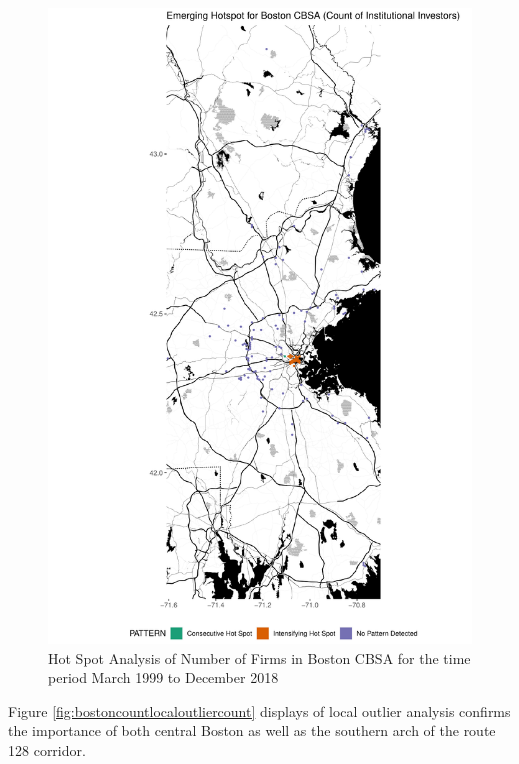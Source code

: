 \begin{figure}
	\centering
	\includegraphics[width=1\linewidth]{Figures/ChapterIV/Bos_Count_EH}
	\caption[Hot Spot Analysis of Number of Firms in Boston CBSA 1999-2018]{Hot Spot Analysis of Number of Firms in Boston CBSA for the time period March 1999 to December 2018}
	\label{fig:bostoncounthotspot}
\end{figure}

Figure \ref{fig:bostoncountlocaloutliercount} displays of local outlier analysis confirms the importance of both central Boston as well as the southern arch of the route 128 corridor.   	

